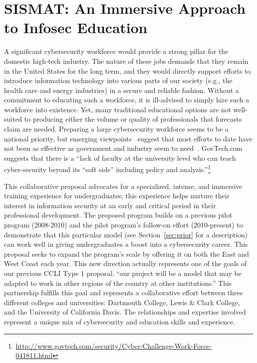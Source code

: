 \section{SISMAT: An Immersive Approach to Infosec Education}
\label{sec:intro}

A significant cybersecurity workforce would provide a strong pillar
for the domestic high-tech industry.  The nature of these jobs demands
that they remain in the United States for the long term, and they
would directly support efforts to introduce information technology
into various parts of our society (e.g., the health care and energy
industries) in a secure and reliable fashion.  Without a commitment to
educating such a workforce, it is ill-advised to simply hire such a
workforce into existence.  Yet, many traditional educational options
are not well-suited to producing either the volume or quality of
professionals that forecasts~\cite{krebs} claim are needed.  Preparing
a large cybersecurity workforce seems to be a national priority, but
emerging viewpoints~\cite{cooper2009sigcse} suggest that most efforts
to date have not been as effective as government and industry seem to
need~\cite{locasto2011cacm}.  GovTech.com suggests that there is a
``lack of faculty at the university level who can teach cyber-security
beyond its ``soft side'' including policy and
analysis.''\footnote{\url{http://www.govtech.com/security/Cyber-Challenge-Work-Force-041811.html}}

This collaborative proposal advocates for a specialized, intense, and
immersive training experience for undergraduates; this experience
helps nurture their interest in information security at an early and
critical period in their professional development.  The proposed
program builds on a previous pilot program (2008-2010) and the pilot
program's follow-on effort (2010-present) to demonstrate that this
particular model (see Section~\ref{sec:prior} for a description) can
work well in giving undergraduates a boost into a cybersecurity
career.  This proposal seeks to expand the program's scale by offering
it on both the East and West Coast each year. This new direction
actually represents one of the goals of our previous CCLI Type 1
proposal: ``our project will be a model that may be adapted to work in
other regions of the country at other institutions.''  This
partnership fulfills this goal and represents a collaborative effort
between three different colleges and universities: Dartmouth College,
Lewis \& Clark College, and the University of California Davis.  The
relationships and expertise involved represent a unique mix of
cybersecurity and education skills and experience.

